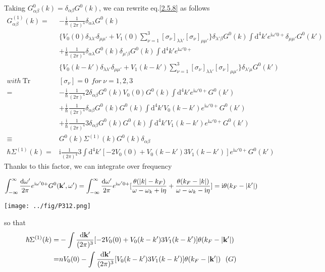 Taking $G_{\alpha\beta}^0(k)=\delta_{\alpha\beta}G^0(k)$, we can rewrite eq.\eqref{2.5.8} as follows  
\begin{align}
G_{\alpha\beta}^{(1)}(k)=&-\frac{\mathrm{i}}{\hbar}\frac{1}{(2\pi)^4}\delta_{\alpha\lambda}G^{0}(k)
\nonumber \\
&\{V_0(0) \delta_{\lambda\lambda'}\delta_{\mu\mu'}+V_1(0)\sum_{\nu=1}^{3}[\sigma_{\nu}]_{\lambda\lambda'}[\sigma_{\nu}]_{\mu\mu'}\}\delta_{\lambda'\beta}G^0(k)\int \mathrm{d}^4k'e^{\mathrm{i}\omega'0+}\delta_{\mu\mu'}G^0(k')\nonumber \\
&+\frac{\mathrm{i}}{\hbar}\frac{1}{(2\pi)^4}\delta_{\alpha\lambda}G^0(k)\delta_{\mu'\beta}G^0(k)\int \mathrm{d}^4k'e^{\mathrm{i}\omega'0+}\nonumber\\
&\{V_0(k-k') \delta_{\lambda\lambda'}\delta_{\mu\mu'}+V_1(k-k')\sum_{\nu=1}^{3}[\sigma_{\nu}]_{\lambda\lambda'}[\sigma_{\nu}]_{\mu\mu'}\}\delta_{\lambda'\mu}G^0(k') \nonumber \\
with\ \mathrm{Tr}&[\sigma_{\nu}]=0\ \ for \ \nu=1,2,3 \nonumber \\
=&-\frac{\mathrm{i}}{\hbar}\frac{1}{(2\pi)^4}2\delta_{\alpha\beta}G^{0}(k)V_0(0)G^0(k)\int \mathrm{d}^4k'e^{\mathrm{i}\omega'0+}G^0(k')\nonumber \\
&+\frac{\mathrm{i}}{\hbar}\frac{1}{(2\pi)^4}\delta_{\alpha\beta}G^{0}(k)G^0(k)\int \mathrm{d}^4k'V_0(k-k')e^{\mathrm{i}\omega'0+}G^0(k')\nonumber \\
&+\frac{\mathrm{i}}{\hbar}\frac{1}{(2\pi)^4}3\delta_{\alpha\beta}G^{0}(k)G^0(k)\int \mathrm{d}^4k'V_1(k-k')e^{\mathrm{i}\omega'0+}G^0(k')\nonumber \\
\equiv& G^{0}(k)\Sigma^{(1)}(k)G^0(k)\delta_{\alpha\beta} \nonumber \\
\hbar \Sigma^{(1)}(k)=& \mathrm{i}\frac{1}{(2\pi)^4}3\int \mathrm{d}^4k'[-2V_0(0)+V_0(k-k')3V_1(k-k')]e^{\mathrm{i}\omega'0+}G^0(k') \nonumber
\end{align}
Thanks to this factor, we can integrate over frequency

\begin{align}
\int_{-\infty}^{\infty}\frac{\mathrm{d}\omega'}{2\pi}e^{\mathrm{i}\omega'0+}G^0({\bf k}',\omega')=\int_{-\infty}^{\infty}\frac{\mathrm{d}\omega'}{2\pi}e^{\mathrm{i}\omega'0+}[\frac{\theta(|k|-k_F)}{\omega-\omega_k+\mathrm{i}\eta}+\frac{\theta(k_F-|k|)}{\omega-\omega_k-\mathrm{i}\eta}]=\mathrm{i}\theta(k_F-|k'|) \nonumber
\end{align}
\begin{center}
\texttt{[image: ../fig/P312.png]}
\end{center}
so that
\begin{align}\label{2.5.9}
\hbar \Sigma^{(1)}(k)=&-\int \frac{\mathrm{d}{\bf k}'}{(2\pi)^3}[-2V_0(0)+V_0(k-k')3V_1(k-k')]\theta(k_F-|{\bf k}'|) \nonumber \\
=& n V_0(0)-\int \frac{\mathrm{d}{\bf k}'}{(2\pi)^3}[V_0(k-k')3V_1(k-k')]\theta(k_F-|{\bf k}'|) \ \ (G) 
\end{align}

